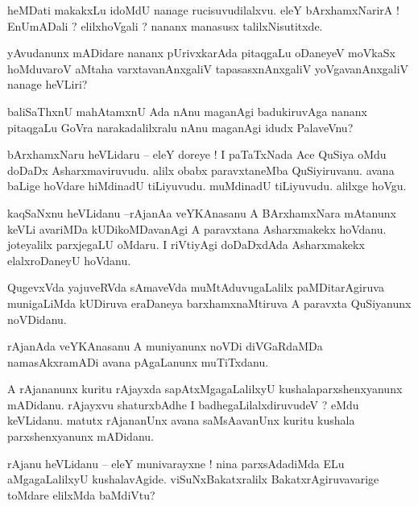 \documentclass{article}
\begin{document}
\begin{mn}%
heMDati makakxLu idoMdU nanage rucisuvudilalxvu. eleY bArxhamxNarirA ! EnUmADali ? elilxhoVgali ? 
nananx manasusx talilxNisutitxde.
\end{mn}

\begin{mn}%
yAvudanunx mADidare nananx pUrivxkarAda pitaqgaLu oDaneyeV moVkaSx hoMduvaroV aMtaha 
varxtavanAnxgaliV tapasasxnAnxgaliV yoVgavanAnxgaliV nanage heVLiri?
\end{mn}

\begin{mn}%
baliSaThxnU mahAtamxnU Ada nAnu maganAgi badukiruvAga nananx pitaqgaLu GoVra narakadalilxralu nAnu 
maganAgi idudx PalaveVnu?
\end{mn}

\begin{mn}%
bArxhamxNaru heVLidaru -- eleY doreye ! I paTaTxNada Ace QuSiya oMdu doDaDx Asharxmaviruvudu. alilx 
obabx paravxtaneMba QuSiyiruvanu. avana baLige hoVdare hiMdinadU tiLiyuvudu. muMdinadU tiLiyuvudu. 
alilxge hoVgu.
\end{mn}

\begin{mn}%
kaqSaNxnu heVLidanu --rAjanAa veYKAnasanu A BArxhamxNara mAtanunx keVLi avariMDa kUDikoMDavanAgi A 
paravxtana Asharxmakekx hoVdanu. joteyalilx parxjegaLU oMdaru. I riVtiyAgi doDaDxdAda Asharxmakekx 
elalxroDaneyU hoVdanu.
\end{mn}

\begin{mn}%
QugevxVda yajuveRVda sAmaveVda muMtAduvugaLalilx paMDitarAgiruva munigaLiMda kUDiruva eraDaneya 
barxhamxnaMtiruva A paravxta QuSiyanunx noVDidanu.
\end{mn}

\begin{mn}%
rAjanAda veYKAnasanu A muniyanunx noVDi diVGaRdaMDa namasAkxramADi avana pAgaLanunx muTiTxdanu.
\end{mn}

\begin{mn}%
A rAjananunx kuritu rAjayxda sapAtxMgagaLalilxyU kushalaparxshenxyanunx mADidanu. rAjayxvu 
shaturxbAdhe I badhegaLilalxdiruvudeV ? eMdu keVLidanu. matutx rAjananUnx avana saMsAavanUnx 
kuritu kushala parxshenxyanunx mADidanu.
\end{mn}

\begin{mn}%
rAjanu heVLidanu -- eleY munivarayxne ! nina parxsAdadiMda ELu aMgagaLalilxyU kushalavAgide. 
viSuNxBakatxralilx BakatxrAgiruvavarige toMdare elilxMda baMdiVtu?
\end{mn}
\end{document}
